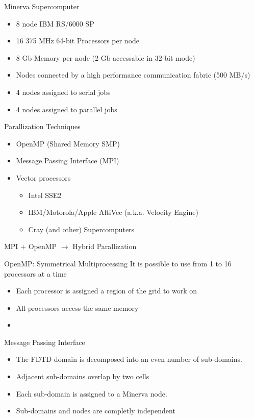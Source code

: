 \documentclass[pdf, nototal, slideBW]{prosper}
\newcommand{\insgraphic}[2]{
  \begin{center}
    \scalebox{#1}{
      \texttt{[image: \#2]}
    }
  \end{center}
}
\begin{document}
\begin{slide}{Minerva Supercomputer}
  \insgraphic{1}{minerva-sp.eps}
  
  \begin{itemize}
  \item 8 node IBM RS/6000 SP 
  \item 16 375 MHz 64-bit Processors per node
  \item 8 Gb Memory per node (2 Gb accessable in 32-bit mode)
  \item Nodes connected by a high performance communication fabric (500 MB/s)
  \item 4 nodes assigned to serial jobs
  \item 4 nodes assigned to parallel jobs
  \end{itemize}
\end{slide}

\begin{slide}{Parallization Techniques}
  \begin{itemize}
  \item OpenMP (Shared Memory SMP)
  \item Message Passing Interface (MPI)
  \item Vector processors
    \begin{itemize}
    \item Intel SSE2
    \item IBM/Motorola/Apple AltiVec (a.k.a. Velocity Engine)
    \item Cray (and other) Supercomputers
    \end{itemize}
  \end{itemize}

  MPI + OpenMP $\rightarrow$ Hybrid Parallization
\end{slide}

\begin{slide}{OpenMP: Symmetrical Multiprocessing}
  It is possible to use from 1 to 16 processors at a time
  \begin{itemize}
  \item Each processor is assigned a region of the grid to work on
  \item All processors access the same memory
  \item 
  \end{itemize}

\end{slide}

\begin{slide}{Message Passing Interface}

  \begin{itemize}
  \item The FDTD domain is decomposed into an even number of
    sub-domains.
  \item Adjacent sub-domains overlap by two cells
  \item Each sub-domain is assigned to a Minerva node.
  \item Sub-domains and nodes are completly independent 
  \end{itemize}

  \insgraphic{1}{domain-decomp.eps}
  
\end{slide}
\end{document}
